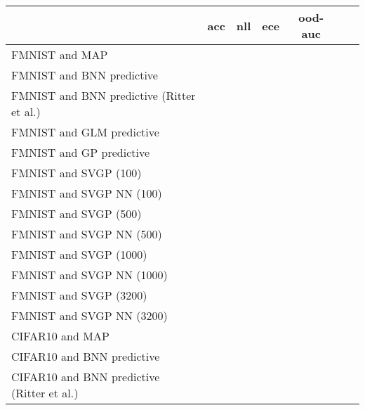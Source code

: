 \begin{tabular}{l C{0.6\tblw} C{0.6\tblw} C{0.6\tblw} C{0.6\tblw} C{0.6\tblw}  C{0.6\tblw}}
\toprule
& acc & nll & ece & ood-auc  \\
\midrule
\sc FMNIST and MAP &  &  &  &  \\
\sc FMNIST and BNN predictive &  &  &  &  \\
\sc FMNIST and BNN predictive (Ritter et al.) &  &  &  &  \\
\sc FMNIST and GLM predictive &  &  &  &  \\
\sc FMNIST and GP predictive &  &  &  &  \\
\sc FMNIST and SVGP (100) &  &  &  &  \\
\sc FMNIST and SVGP NN (100) &  &  &  &  \\
\sc FMNIST and SVGP (500) &  &  &  &  \\
\sc FMNIST and SVGP NN (500) &  &  &  &  \\
\sc FMNIST and SVGP (1000) &  &  &  &  \\
\sc FMNIST and SVGP NN (1000) &  &  &  &  \\
\sc FMNIST and SVGP (3200) &  &  &  &  \\
\sc FMNIST and SVGP NN (3200) &  &  &  &  \\
\sc CIFAR10 and MAP &  &  &  &  \\
\sc CIFAR10 and BNN predictive &  &  &  &  \\
\sc CIFAR10 and BNN predictive (Ritter et al.) &  &  &  &  \\

\end{tabular}
